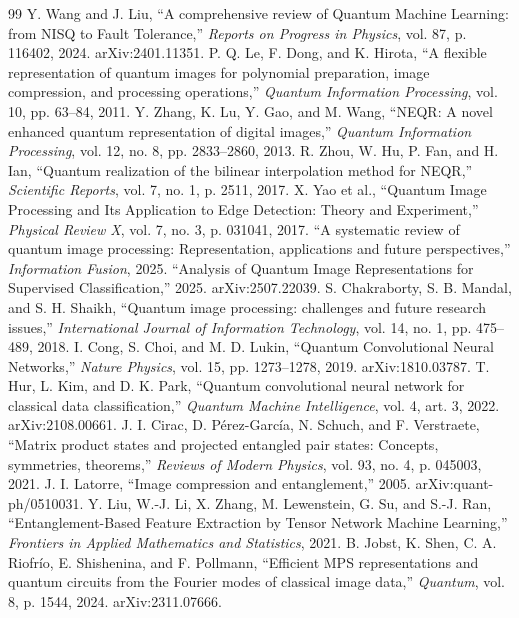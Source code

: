 \documentclass[11pt]{article}
\begin{document}
\begin{thebibliography}{99}
 Y. Wang and J. Liu, ``A comprehensive review of Quantum Machine Learning: from NISQ to Fault Tolerance,'' \textit{Reports on Progress in Physics}, vol. 87, p. 116402, 2024. arXiv:2401.11351.
 P. Q. Le, F. Dong, and K. Hirota, ``A flexible representation of quantum images for polynomial preparation, image compression, and processing operations,'' \textit{Quantum Information Processing}, vol. 10, pp. 63--84, 2011.
 Y. Zhang, K. Lu, Y. Gao, and M. Wang, ``NEQR: A novel enhanced quantum representation of digital images,'' \textit{Quantum Information Processing}, vol. 12, no. 8, pp. 2833--2860, 2013.
 R. Zhou, W. Hu, P. Fan, and H. Ian, ``Quantum realization of the bilinear interpolation method for NEQR,'' \textit{Scientific Reports}, vol. 7, no. 1, p. 2511, 2017.
 X. Yao et al., ``Quantum Image Processing and Its Application to Edge Detection: Theory and Experiment,'' \textit{Physical Review X}, vol. 7, no. 3, p. 031041, 2017.
 ``A systematic review of quantum image processing: Representation, applications and future perspectives,'' \textit{Information Fusion}, 2025.
 ``Analysis of Quantum Image Representations for Supervised Classification,'' 2025. arXiv:2507.22039.
 S. Chakraborty, S. B. Mandal, and S. H. Shaikh, ``Quantum image processing: challenges and future research issues,'' \textit{International Journal of Information Technology}, vol. 14, no. 1, pp. 475--489, 2018.
 I. Cong, S. Choi, and M. D. Lukin, ``Quantum Convolutional Neural Networks,'' \textit{Nature Physics}, vol. 15, pp. 1273--1278, 2019. arXiv:1810.03787.
 T. Hur, L. Kim, and D. K. Park, ``Quantum convolutional neural network for classical data classification,'' \textit{Quantum Machine Intelligence}, vol. 4, art. 3, 2022. arXiv:2108.00661.
 J. I. Cirac, D. P\'erez-Garc\'ia, N. Schuch, and F. Verstraete, ``Matrix product states and projected entangled pair states: Concepts, symmetries, theorems,'' \textit{Reviews of Modern Physics}, vol. 93, no. 4, p. 045003, 2021.
 J. I. Latorre, ``Image compression and entanglement,'' 2005. arXiv:quant-ph/0510031.
 Y. Liu, W.-J. Li, X. Zhang, M. Lewenstein, G. Su, and S.-J. Ran, ``Entanglement-Based Feature Extraction by Tensor Network Machine Learning,'' \textit{Frontiers in Applied Mathematics and Statistics}, 2021.
 B. Jobst, K. Shen, C. A. Riofr\'io, E. Shishenina, and F. Pollmann, ``Efficient MPS representations and quantum circuits from the Fourier modes of classical image data,'' \textit{Quantum}, vol. 8, p. 1544, 2024. arXiv:2311.07666.

\end{thebibliography}
\end{document}
